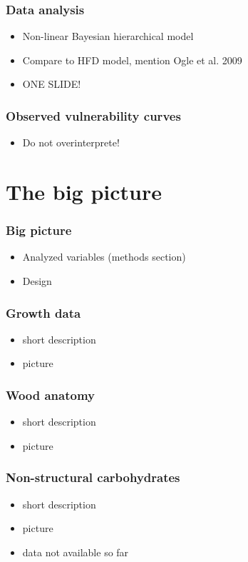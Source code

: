 \documentclass[usepdftitle=false]{beamer}
\begin{document}
\begin{frame}
	\frametitle{Data analysis}
	\begin{itemize}
		\item Non-linear Bayesian hierarchical model
		\item Compare to HFD model, mention Ogle et al. 2009
		\item ONE SLIDE!
	\end{itemize}
\end{frame}

\begin{frame}
	\frametitle{Observed vulnerability curves}
	\begin{itemize}
		\item Do not overinterprete!
	\end{itemize}
\end{frame}

\section{The big picture}
\begin{frame}
	\frametitle{Big picture}
	\begin{itemize}
		\item Analyzed variables (methods section)
		\item Design		
	\end{itemize}
\end{frame}

\begin{frame}
	\frametitle{Growth data}
	\begin{itemize}
		\item short description
		\item picture
	\end{itemize}
\end{frame}

\begin{frame}
	\frametitle{Wood anatomy}
	\begin{itemize}
		\item short description
		\item picture
	\end{itemize}
\end{frame}

\begin{frame}
	\frametitle{Non-structural carbohydrates}
	\begin{itemize}
		\item short description
		\item picture
		\item data not available so far
	\end{itemize}
\end{frame}
\end{document}
